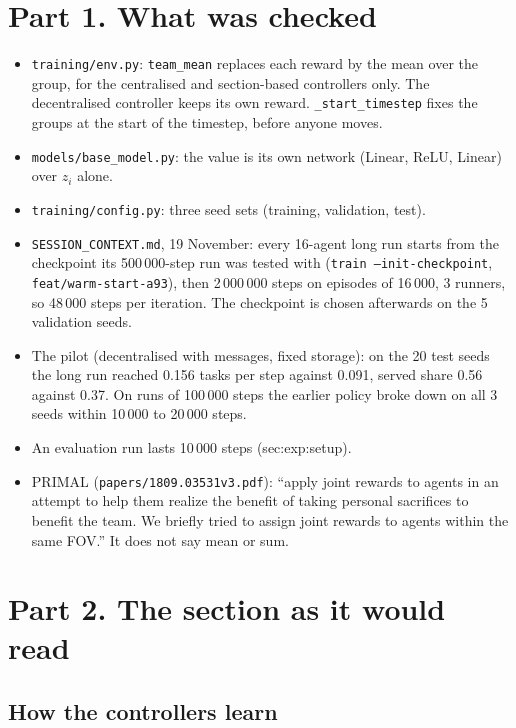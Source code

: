 \documentclass[11pt,a4paper]{article}
\newcommand{\lab}[1]{\textsf{\footnotesize #1}}
\begin{document}
\section*{Part 1. What was checked}
\begin{itemize}[nosep]
  \item \texttt{training/env.py}: \texttt{team\_mean} replaces each reward by
    the mean over the group, for the centralised and section-based
    controllers only. The decentralised controller keeps its own reward.
    \texttt{\_start\_timestep} fixes the groups at the start of the
    timestep, before anyone moves.
  \item \texttt{models/base\_model.py}: the value is its own network
    (Linear, ReLU, Linear) over $z_i$ alone.
  \item \texttt{training/config.py}: three seed sets (training, validation,
    test).
  \item \texttt{SESSION\_CONTEXT.md}, 19 November: every 16-agent long run
    starts from the checkpoint its 500\,000-step run was tested with
    (\texttt{train --init-checkpoint}, \texttt{feat/warm-start-a93}), then
    2\,000\,000 steps on episodes of 16\,000, 3 runners, so 48\,000 steps per
    iteration. The checkpoint is chosen afterwards on the 5 validation seeds.
  \item The pilot (decentralised with messages, fixed storage): on the 20
    test seeds the long run reached 0.156 tasks per step against 0.091,
    served share 0.56 against 0.37. On runs of 100\,000 steps the earlier
    policy broke down on all 3 seeds within 10\,000 to 20\,000 steps.
  \item An evaluation run lasts 10\,000 steps (\lab{sec:exp:setup}).
  \item PRIMAL (\texttt{papers/1809.03531v3.pdf}): ``apply joint rewards to
    agents in an attempt to help them realize the benefit of taking personal
    sacrifices to benefit the team. We briefly tried to assign joint rewards
    to agents within the same FOV.'' It does not say mean or sum.
\end{itemize}

\section*{Part 2. The section as it would read}

\subsection*{How the controllers learn}
\end{document}
